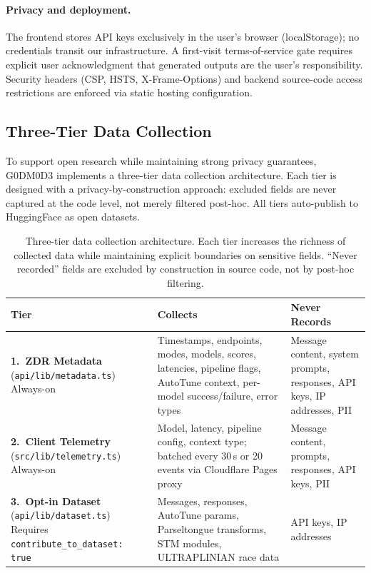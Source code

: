 \documentclass[11pt]{article}
\begin{document}
\paragraph{Privacy and deployment.} The frontend stores API keys exclusively in the user's browser (localStorage); no credentials transit our infrastructure. A first-visit terms-of-service gate requires explicit user acknowledgment that generated outputs are the user's responsibility. Security headers (CSP, HSTS, X-Frame-Options) and backend source-code access restrictions are enforced via static hosting configuration.

\subsection{Three-Tier Data Collection}
\label{sec:datacollection}

To support open research while maintaining strong privacy guarantees, G0DM0D3 implements a three-tier data collection architecture. Each tier is designed with a privacy-by-construction approach: excluded fields are never captured at the code level, not merely filtered post-hoc. All tiers auto-publish to HuggingFace as open datasets.

\begin{table}[t]
\caption{Three-tier data collection architecture. Each tier increases the richness of collected data while maintaining explicit boundaries on sensitive fields. ``Never recorded'' fields are excluded by construction in source code, not by post-hoc filtering.}
\label{tab:datacollection}
\centering
\small
\begin{tabular}{@{}p{2.4cm}p{4.2cm}p{4.2cm}@{}}
\toprule
Tier & Collects & Never Records \\
\midrule
\textbf{1.\ ZDR Metadata} \newline (\texttt{api/lib/metadata.ts}) \newline Always-on &
Timestamps, endpoints, modes, models, scores, latencies, pipeline flags, AutoTune context, per-model success/failure, error types &
Message content, system prompts, responses, API keys, IP addresses, PII \\
\midrule
\textbf{2.\ Client Telemetry} \newline (\texttt{src/lib/telemetry.ts}) \newline Always-on &
Model, latency, pipeline config, context type; batched every 30\,s or 20 events via Cloudflare Pages proxy &
Message content, prompts, responses, API keys, PII \\
\midrule
\textbf{3.\ Opt-in Dataset} \newline (\texttt{api/lib/dataset.ts}) \newline Requires \texttt{contribute\_to\_dataset: true} &
Messages, responses, AutoTune params, Parseltongue transforms, STM modules, ULTRAPLINIAN race data &
API keys, IP addresses \\
\bottomrule
\end{tabular}
\end{table}
\end{document}

